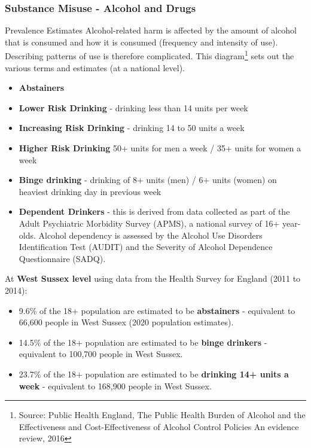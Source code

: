\subsubsection{Substance Misuse - Alcohol and Drugs} Prevalence Estimates Alcohol-related harm is affected by the amount of alcohol that is consumed and how it is consumed (frequency and intensity of use). Describing patterns of use is therefore complicated. This diagram\footnote{Source: Public Health England, The Public Health Burden of Alcohol and the Effectiveness and Cost-Effectiveness of Alcohol Control Policies An evidence review, 2016} sets out the various terms and estimates (at a national level).


\begin{itemize}[noitemsep]
    \item {\bfseries Abstainers}
    \item {\bfseries Lower Risk Drinking} - drinking less than 14 units per week
    \item {\bfseries Increasing Risk Drinking} - drinking 14 to 50 units a week
    \item {\bfseries Higher Risk Drinking} 50+ units for men a week / 35+ units for women a week
    \item {\bfseries Binge drinking} - drinking of 8+ units (men) / 6+ units (women) on heaviest drinking day in previous week
    \item {\bfseries Dependent Drinkers} - this is derived from data collected as part of the Adult Psychiatric Morbidity Survey (APMS), a national survey of 16+ year-olds. Alcohol dependency is assessed by the Alcohol Use Disorders Identification Test (AUDIT) and the Severity of Alcohol Dependence Questionnaire (SADQ).
\end{itemize}

At {\bfseries West Sussex level} using data from the Health Survey for England (2011 to 2014): 

\begin{itemize}[noitemsep]
    \item 9.6\% of the 18+ population are estimated to be {\bfseries abstainers} - equivalent to 66,600 people in West Sussex (2020 population estimates).
    \item 14.5\% of the 18+ population are estimated to be {\bfseries binge drinkers} - equivalent to 100,700 people in West Sussex.
    \item 23.7\% of the 18+ population are estimated to be {\bfseries drinking 14+ units a week} - equivalent to 168,900 people in West Sussex.
\end{itemize}

